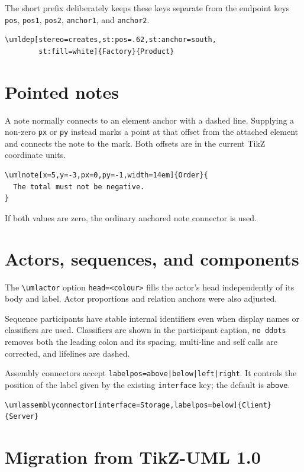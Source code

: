 \documentclass[a4paper,11pt]{report}
\begin{document}
The short prefix deliberately keeps these keys separate from the endpoint keys
\texttt{pos}, \texttt{pos1}, \texttt{pos2}, \texttt{anchor1}, and
\texttt{anchor2}.

\begin{lstlisting}
\umldep[stereo=creates,st:pos=.62,st:anchor=south,
        st:fill=white]{Factory}{Product}
\end{lstlisting}

\section{Pointed notes}

A note normally connects to an element anchor with a dashed line. Supplying a
non-zero \texttt{px} or \texttt{py} instead marks a point at that offset from
the attached element and connects the note to the mark. Both offsets are in the
current TikZ coordinate units.

\begin{lstlisting}
\umlnote[x=5,y=-3,px=0,py=-1,width=14em]{Order}{
  The total must not be negative.
}
\end{lstlisting}

If both values are zero, the ordinary anchored note connector is used.

\section{Actors, sequences, and components}

The \lstinline!\umlactor! option \texttt{head=<colour>} fills the actor's head
independently of its body and label. Actor proportions and relation anchors
were also adjusted.

Sequence participants have stable internal identifiers even when display names
or classifiers are used. Classifiers are shown in the participant caption,
\texttt{no ddots} removes both the leading colon and its spacing, multi-line and
self calls are corrected, and lifelines are dashed.

Assembly connectors accept
\texttt{labelpos=above|below|left|right}. It controls the position of the label
given by the existing \texttt{interface} key; the default is \texttt{above}.

\begin{lstlisting}
\umlassemblyconnector[interface=Storage,labelpos=below]{Client}{Server}
\end{lstlisting}

\section{Migration from TikZ-UML 1.0}
\end{document}
